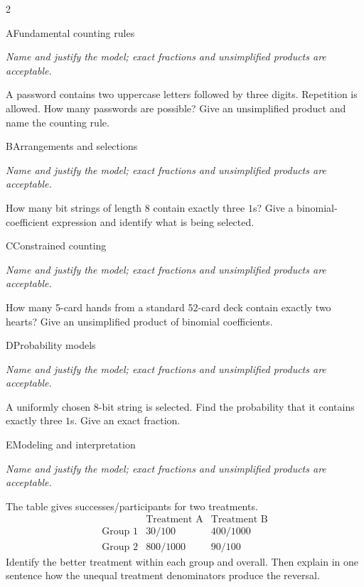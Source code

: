 \documentclass[9pt]{extarticle}
\begin{document}
\begin{multicols}{2}
\begin{CoreProblem}{A}{Fundamental counting rules}
{\scriptsize\textit{Name and justify the model; exact fractions and unsimplified products are acceptable.}\par}
A password contains two uppercase letters followed by three digits.
    Repetition is allowed. How many passwords are possible? Give an unsimplified
    product and name the counting rule.
\end{CoreProblem}
\begin{CoreProblem}{B}{Arrangements and selections}
{\scriptsize\textit{Name and justify the model; exact fractions and unsimplified products are acceptable.}\par}
How many bit strings of length 8 contain exactly three $1$s? Give a
    binomial-coefficient expression and identify what is being selected.
\end{CoreProblem}
\begin{CoreProblem}{C}{Constrained counting}
{\scriptsize\textit{Name and justify the model; exact fractions and unsimplified products are acceptable.}\par}
How many 5-card hands from a standard 52-card deck contain exactly
    two hearts? Give an unsimplified product of binomial coefficients.
\end{CoreProblem}
\columnbreak
\begin{CoreProblem}{D}{Probability models}
{\scriptsize\textit{Name and justify the model; exact fractions and unsimplified products are acceptable.}\par}
A uniformly chosen 8-bit string is selected. Find the probability
    that it contains exactly three $1$s. Give an exact fraction.
\end{CoreProblem}
\begin{CoreProblem}{E}{Modeling and interpretation}
{\scriptsize\textit{Name and justify the model; exact fractions and unsimplified products are acceptable.}\par}
The table gives successes/participants for two treatments.
    \[
    \begin{array}{c|cc}
      &\text{Treatment A}&\text{Treatment B}\\\hline
      \text{Group 1}&30/100&400/1000\\
      \text{Group 2}&800/1000&90/100
    \end{array}
    \]
    Identify the better treatment within each group and overall. Then explain in
    one sentence how the unequal treatment denominators produce the reversal.
\end{CoreProblem}
\end{multicols}
\end{document}

